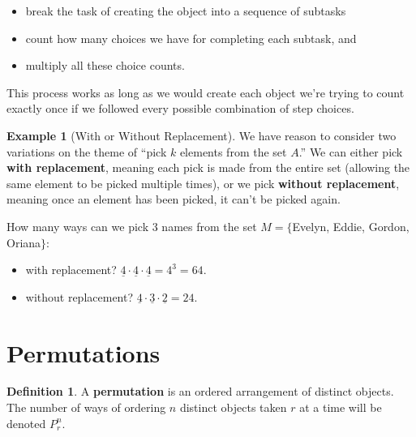 \documentclass[
]{book}
\providecommand{\tightlist}{%
  \setlength{\itemsep}{0pt}\setlength{\parskip}{0pt}}
\theoremstyle{definition}
\newtheorem{definition}{Definition}[chapter]
\theoremstyle{definition}
\newtheorem{example}{Example}[chapter]
\theoremstyle{definition}
\theoremstyle{definition}
\theoremstyle{remark}
\begin{document}
\begin{itemize}
\tightlist
\item
  break the task of creating the object into a sequence of subtasks
\item
  count how many choices we have for completing each subtask, and
\item
  multiply all these choice counts.
\end{itemize}

This process works as long as we would create each object we're trying to count exactly once if we followed every possible combination of step choices.

\begin{example}[With or Without Replacement]

We have reason to consider two variations on the theme of ``pick \(k\) elements from the set \(A\).'' We can either pick \textbf{with replacement}, meaning each pick is made from the entire set (allowing the same element to be picked multiple times), or we pick \textbf{without replacement}, meaning once an element has been picked, it can't be picked again.

How many ways can we pick 3 names from the set \(M = \{\)Evelyn, Eddie, Gordon, Oriana\(\}\):

\begin{itemize}
\tightlist
\item
  with replacement? \(\displaystyle \underline{4}\cdot \underline{4}\cdot \underline{4} = 4^3 = 64.\)
\item
  without replacement? \(\displaystyle \underline{4}\cdot \underline{3}\cdot \underline{2} = 24.\)
\end{itemize}

\end{example}

\section{Permutations}\label{permutations}

\begin{definition}
\protect\hypertarget{def:permutation}{}\label{def:permutation}A \textbf{permutation} is an ordered arrangement of distinct objects. The number of ways of ordering \(n\) distinct objects taken \(r\) at a time will be denoted \(\displaystyle P^n_r\).
\end{definition}
\end{document}
